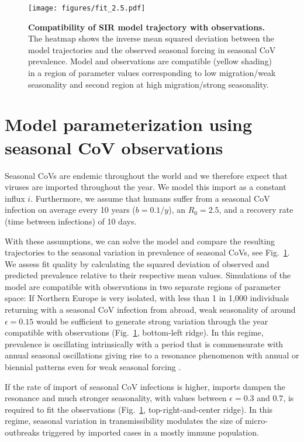 \documentclass[rmp, reprint, superscriptaddress, floatfix,amsmath]{revtex4-1}
\begin{document}
\begin{figure}
    \centering
    \texttt{[image: figures/fit\_2.5.pdf]}
    \caption{{\bf Compatibility of SIR model trajectory with observations.} The heatmap shows the inverse mean squared deviation between the model trajectories and the observed seasonal forcing in seasonal CoV prevalence. Model and observations are compatible (yellow shading) in a region of parameter values corresponding to low migration/weak seasonality and second region at high migration/strong seasonality. }
    \label{fig:parameter_seasonal}
\end{figure}

\section{Model parameterization using seasonal CoV observations}
Seasonal CoVs are endemic throughout the world and we therefore expect that viruses are imported throughout the year. 
We model this import as a constant influx $i$. 
Furthermore, we assume that humans suffer from a seasonal CoV infection on average every 10 years ($b=0.1/y$), an $R_0=2.5$, and a recovery rate (time between infections) of 10 days.

With these assumptions, we can solve the model and compare the resulting trajectories to the seasonal variation in prevalence of seasonal CoVs, see Fig.~\ref{fig:parameter_seasonal}.
We assess fit quality by calculating the squared deviation of observed and predicted prevalence relative to their respective mean values. 
Simulations of the model are compatible with observations in two separate regions of parameter space: If Northern Europe is very isolated, with less than 1 in 1,000 individuals returning with a seasonal CoV infection from abroad, weak seasonality of around $\epsilon=0.15$ would be sufficient to generate strong variation through the year compatible with observations (Fig.~\ref{fig:parameter_seasonal}, bottom-left ridge).
In this regime, prevalence is oscillating intrinsically with a period that is commensurate with annual seasonal oscillations giving rise to a resonance phenomenon with annual or biennial patterns even for weak seasonal forcing \citep{dushoff_dynamical_2004,chen_regular_2017}.

If the rate of import of seasonal CoV infections is higher, imports dampen the resonance and much stronger seasonality, with values between $\epsilon=0.3$ and $0.7$, is required to fit the observations (Fig.~\ref{fig:parameter_seasonal}, top-right-and-center ridge).
In this regime, seasonal variation in transmissibility modulates the size of micro-outbreaks triggered by imported cases in a mostly immune population. 
\end{document}
